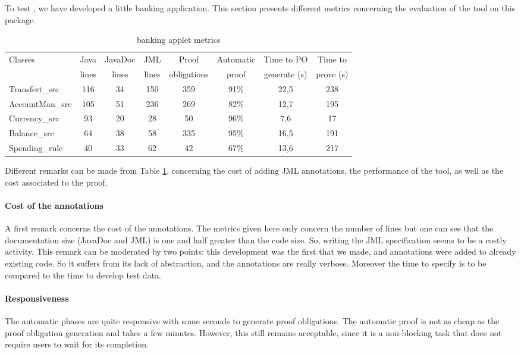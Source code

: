 \label{Case Study}
To test \JACK, we have developed a little banking application.  This section presents different metrics
concerning the evaluation of the tool on this package.
\begin{table}
 \begin{tabular}{|l|c|c|c|c|c|c|c|} \hline
 Classes & Java & JavaDoc & JML & Proof & Automatic & Time to PO & Time to \\
  & lines & lines & lines & obligations & proof & generate (s) & prove (s)\\  \hline
 Transfert\_src  & 116 & 34 & 150 & 359 & 91\% & 22,5 & 238 \\
 AccountMan\_src & 105 & 51 & 236 & 269 & 82\% & 12,7 & 195 \\
 Currency\_src   &  93 & 20 &  28 &  50 & 96\% &  7,6 &  17 \\
 Balance\_src    &  64 & 38 &  58 & 335 & 95\% & 16,5 & 191 \\
 Spending\_rule  &  40 & 33 &  62 &  42 & 67\% & 13,6 & 217 \\ \hline
 \end{tabular}
\caption{banking applet metrics}
\label{MetricsTable}
\end{table}
Different remarks can be made from Table \ref{MetricsTable}, concerning the cost of adding JML annotations, the
performance of the tool, as well as the cost associated to the proof.
\paragraph{Cost of the annotations}
A first remark concerns the cost of the annotations.  The metrics given here only concern the number of lines
but one can see that the documentation size (JavaDoc and JML) is one and half greater than the code size.  So,
writing  the JML specification seems to be a costly activity.  This remark can be moderated by two points: this
development was the first that we made, and annotations were added to already existing code. So it suffers from
its lack of abstraction, and the annotations are really verbose. Moreover the time to specify is to be compared
to the time to develop test data.
\paragraph{Responsiveness}
The automatic phases are quite responsive with some seconds to generate proof obligations.  The automatic proof
is not as cheap as the proof obligation generation and takes a few minutes. However, this still remains
acceptable, since it is a non-blocking task that does not require users to wait for its completion.

